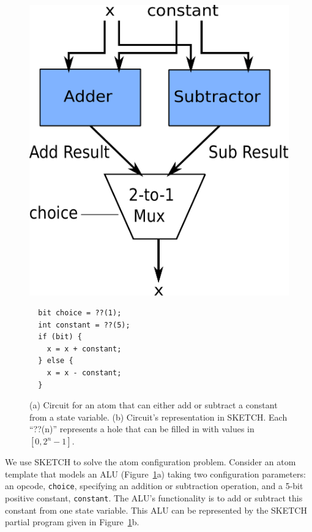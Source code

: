 \begin{figure}[h]
  \begin{minipage}{0.4\columnwidth}
  \begin{center}
  \includegraphics[width=\columnwidth]{circuit.pdf}
  \end{center}
  \end{minipage}
  \begin{minipage}{0.55\columnwidth}
  \begin{center}
  \begin{lstlisting}
  bit choice = ??(1);
  int constant = ??(5);
  if (bit) {
    x = x + constant;
  } else {
    x = x - constant;
  }
  \end{lstlisting}
  \end{center}
  \end{minipage}
\caption{\small (a) Circuit for an atom that can either add or subtract a
constant from a state variable.  (b) Circuit's representation in SKETCH.
Each ``??(n)'' represents a hole that can be filled in with values in
  $[0, 2^n -1]$.}
\label{fig:alu_in_sketch}
\end{figure}

We use SKETCH to solve the atom configuration problem.  Consider an atom
template that models an ALU (Figure~\ref{fig:alu_in_sketch}a) taking two
configuration parameters: an opcode, \texttt{choice}, specifying an addition or
subtraction operation, and a 5-bit positive constant, \texttt{constant}.  The ALU's
functionality is to add or subtract this constant from one state variable. This
ALU can be represented by the SKETCH partial program given in
Figure~\ref{fig:alu_in_sketch}b.

